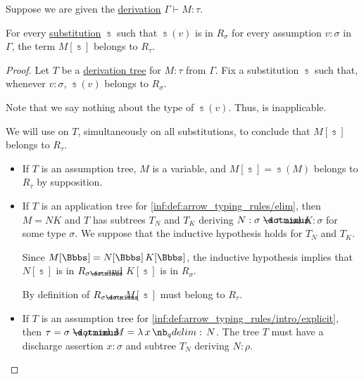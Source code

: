 \begin{lemma}\label{thm:reducibility_candidate_substitution}
  Suppose we are given the \hyperref[def:simple_type_derivability]{derivation} \( \Gamma \vdash M: \tau \).

  For every \hyperref[def:lambda_term_substitution]{substitution} \( \Bbbs \) such that \( \Bbbs(v) \) is in \( R_\sigma \) for every assumption \( v: \sigma \) in \( \Gamma \), the term \( M[\Bbbs] \) belongs to \( R_\tau \).
\end{lemma}
\begin{proof}
  Let \( T \) be a \hyperref[def:type_derivation_tree]{derivation tree} for \( M: \tau \) from \( \Gamma \). Fix a substitution \( \Bbbs \) such that, whenever \( v: \sigma \), \( \Bbbs(v) \) belongs to \( R_\sigma \).

  Note that we say nothing about the type of \( \Bbbs(v) \). Thus,  is inapplicable.

  We will use  on \( T \), simultaneously on all substitutions, to conclude that \( M[\Bbbs] \) belongs to \( R_\tau \).
  \begin{itemize}
    \item If \( T \) is an assumption tree, \( M \) is a variable, and \( M[\Bbbs] = \Bbbs(M) \) belongs to \( R_\tau \) by supposition.

    \item If \( T \) is an application tree for \ref{inf:def:arrow_typing_rules/elim}, then \( M = NK \) and \( T \) has subtrees \( T_N \) and \( T_K \) deriving \( N: \sigma \synimplies \tau \) and \( K: \sigma \) for some type \( \sigma \). We suppose that the inductive hypothesis holds for \( T_N \) and \( T_K \).

    Since \( M[\Bbbs] = N[\Bbbs] \thinspace K[\Bbbs] \), the inductive hypothesis implies that \( N[\Bbbs] \) is in \( R_{\sigma \synimplies \tau} \) and \( K[\Bbbs] \) is in \( R_\sigma \).

    By definition of \( R_{\sigma \synimplies \tau} \), \( M[\Bbbs] \) must belong to \( R_\tau \).

    \item If \( T \) is an assumption tree for \ref{inf:def:arrow_typing_rules/intro/explicit}, then \( \tau = \sigma \synimplies \rho \) and \( M = \qabs x N \). The tree \( T \) must have a discharge assertion \( x: \sigma \) and subtree \( T_N \) deriving \( N: \rho \).


\end{itemize}
\end{proof}
